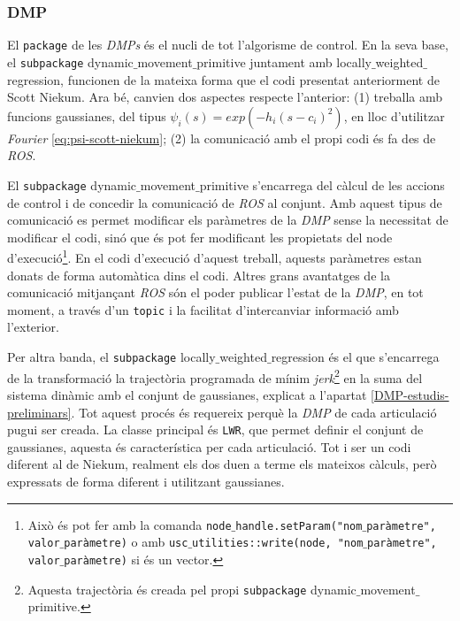 \documentclass[12pt,a4paper,final,twoside]{report}
\begin{document}

\subsubsection{DMP}

El \texttt{package} de les \textit{DMPs} és el nucli de tot l'algorisme de control. En la seva base, el \texttt{subpackage} dynamic$\_$movement$\_$primitive juntament amb locally$\_$weighted$\_$regression, funcionen de la mateixa forma que el codi presentat anteriorment de Scott Niekum. Ara bé, canvien dos aspectes respecte l'anterior: (1) treballa amb funcions gaussianes, del tipus $\psi_i(s)=exp(-h_i(s-c_i)^2)$, en lloc d'utilitzar \textit{Fourier} \eqref{eq:psi-scott-niekum}; (2) la comunicació amb el propi codi és fa des de \textit{ROS}. 

El \texttt{subpackage} dynamic$\_$movement$\_$primitive s'encarrega del càlcul de les accions de control i de concedir la comunicació de \textit{ROS} al conjunt. Amb aquest tipus de comunicació es permet modificar els paràmetres de la \textit{DMP} sense la necessitat de modificar el codi, sinó que és pot fer modificant les propietats del node d'execució\footnote{Això és pot fer amb la comanda \texttt{node$\_$handle.setParam("nom$\_$paràmetre", valor$\_$paràmetre)} o amb \texttt{usc$\_$utilities::write(node, "nom$\_$paràmetre", valor$\_$paràmetre)} si és un vector.}. En el codi d'execució d'aquest treball, aquests paràmetres estan donats de forma automàtica dins el codi. Altres grans avantatges de la comunicació mitjançant \textit{ROS} són el poder publicar l'estat de la \textit{DMP}, en tot moment, a través d'un \texttt{topic} i la facilitat d'intercanviar informació amb l'exterior.


Per altra banda, el \texttt{subpackage} locally$\_$weighted$\_$regression és el que s'encarrega de la transformació la trajectòria programada de mínim \textit{jerk}\footnote{Aquesta trajectòria és creada pel propi \texttt{subpackage} dynamic$\_$movement$\_$primitive.} en la suma del sistema dinàmic amb el conjunt de gaussianes, explicat a l'apartat \ref{DMP-estudis-preliminars}. Tot aquest procés és requereix perquè la \textit{DMP} de cada articulació pugui ser creada. La classe principal és \texttt{LWR}, que permet definir el conjunt de gaussianes, aquesta és característica per cada articulació. Tot i ser un codi diferent al de Niekum, realment els dos duen a terme els mateixos càlculs, però expressats de forma diferent i utilitzant gaussianes.
\end{document}
